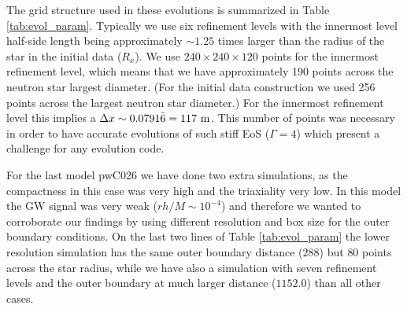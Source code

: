 \documentclass[twocolumn,superscriptaddress,showpacs,prd,aps,amsmath,amssymb,nofootinbib]{revtex4-1}
\begin{document}
The grid structure used in these evolutions is summarized in Table
\ref{tab:evol_param}.  Typically we use six refinement levels with the
innermost level half-side length being approximately $\sim 1.25$ times
larger than the radius of the star in the initial data ($R_x$). We use
$240 \times 240 \times 120$ points for the innermost refinement level,
which means that we have approximately 190 points across the neutron
star largest diameter. (For the initial data construction we used 256 
points across the largest neutron star diameter.) 
For the innermost refinement level this implies a $\Delta x
\sim 0.0791\bar{6}=117\ {\rm m}$.  This number of points was necessary
in order to have accurate evolutions of such stiff EoS
($\Gamma=4$) which present a challenge for any evolution code.

For the last model pwC026 we have done two extra simulations, as the
compactness in this case was very high and the triaxiality very low. 
In this model the GW signal was very weak
($rh/M \sim 10^{-4}$) and therefore we wanted to corroborate our
findings by using different resolution and box size for the outer
boundary conditions.  On the last two lines of Table
\ref{tab:evol_param} the lower resolution simulation has the same
outer boundary distance ($288$) but $80$ points across the star
radius, while we have also a simulation with seven refinement levels
and the outer boundary at much larger distance ($1152.0$) than all
other cases.

\end{document}
